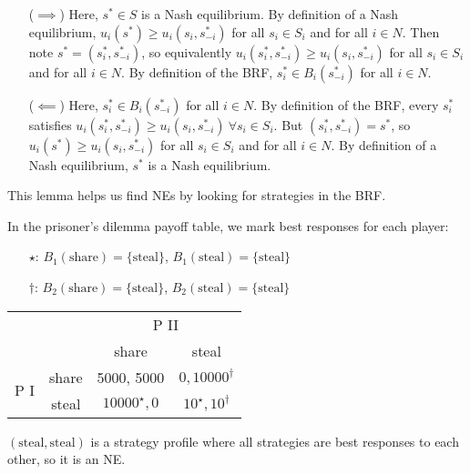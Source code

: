 \documentclass[12pt,letterpaper]{report}
\begin{document}
\begin{thmproof}
  \begin{itemize}[leftmargin=4em]
    \item[($\implies$)]
      Here, $s^* \in S$ is a Nash equilibrium.
      By definition of a Nash equilibrium, $u_i(s^*) \geq u_i(s_i, s_{-i}^*)$ for all $s_i \in S_i$
      and for all $i \in N$.
      Then note $s^* = (s_i^*, s_{-i}^*)$, so equivalently
      $u_i(s_i^*, s_{-i}^*) \geq u_i(s_i, s_{-i}^*)$ for all $s_i \in S_i$ and for all $i \in N$.
      By definition of the BRF, $s_i^* \in B_i(s_{-i}^*)$ for all $i \in N$.
    \item[($\impliedby$)]
      Here, $s_i^* \in B_i(s_{-i}^*)$ for all $i \in N$.
      By definition of the BRF, every $s_i^*$ satisfies
      $u_i(s_i^*, s_{-i}^*) \geq u_i(s_i, s_{-i}^*) \ \forall s_i \in S_i$.
      But $(s_i^*, s_{-i}^*) = s^*$, so $u_i(s^*) \geq u_i(s_i, s_{-i}^*)$ for all $s_i \in S_i$ and
      for all $i \in N$.
      By definition of a Nash equilibrium, $s^*$ is a Nash equilibrium.
  \end{itemize}
\end{thmproof}

This lemma helps us find NEs by looking for strategies in the BRF.

\begin{ex}
  In the prisoner's dilemma payoff table, we mark best responses for each player:
  \begin{itemize}
    \item[$\star$:] $B_1(\text{share}) = \{\text{steal}\}$, $B_1(\text{steal}) = \{\text{steal}\}$
    \item[$\dagger$:] $B_2(\text{share}) = \{\text{steal}\}$, $B_2(\text{steal}) = \{\text{steal}\}$
  \end{itemize}

  \begin{center}
    \renewcommand{\arraystretch}{1.25}
    \begin{tabular}{c c |c|c|}
      \multicolumn{2}{c}{} & \multicolumn{2}{c}{P II} \\
      \multicolumn{2}{c}{} & \multicolumn{1}{c}{share} & \multicolumn{1}{c}{steal} \\
      \cline{3-4}
      \multirow{2}{*}{P I} & share & 5000, 5000 & $0, 10000^{\dagger}$ \\
      \cline{3-4}
      & steal & $10000^{\star}, 0$ & $10^{\star}, 10^{\dagger}$ \\
      \cline{3-4}
    \end{tabular}
  \end{center}

  $(\text{steal}, \text{steal})$ is a strategy profile where all strategies are best responses to
  each other, so it is an NE.
\end{ex}
\end{document}
